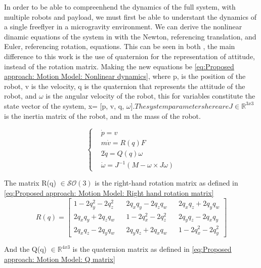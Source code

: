 In order to be able to compreenhend the dynamics of the full system, with multiple robots and payload, we must first be able to understant the dynamics of a single freeflyer in a microgravity environment. We can derive the nonlinear dinamic equations of the system in with the Newton, referencing translation, and Euler, referencing rotation, equations. This can be seen in both \cite{RoqueVentura2016spacecobot}, the main difference to this work is the use of quaternion for the representation of attitude, instead of the rotation matrix. Making the new equations be \ref{eq:Proposed approach: Motion Model: Nonlinear dynamics}, where p, is the position of the robot, v is the velocity, q is the quaternion that represents the attitude of the robot, and $\omega$ is the angular velocity of the robot, this for variables constitute the state vector of the system, x= [p, v, q, $\omega]. The system parameters here are J \in \mathbb{R}^{3x3}$ is the inertia matrix of the robot, and m the mass of the robot.

\begin{equation}
    \begin{cases}
        &\dot{p} = v \\
        &m\dot{v} = R(q)F \\
        &2\dot{q} = Q(q) \omega \\ 
        &\dot{\omega} = J^{-1} \left(M -\omega \times J\omega \right) 
    \end{cases}
    \label{eq:Proposed approach: Motion Model: Nonlinear dynamics}
\end{equation}

The matrix R(q) $\in \mathcal{SO}(3)$ is the right-hand rotation matrix as defined in \ref{eq:Proposed approach: Motion Model: Right hand rotation matrix}
\begin{equation}
    R\left(q\right) = 
    \begin{bmatrix}
    1 - 2q_{y}^{2} - 2q_{z}^{2} && 2q_{x}q_{y} - 2q_{z}q_{w} && 2q_{x}q_{z}+2q_{y}q_{w} \\
        2q_{x}q_{y} + 2q_{z}q_{w} && 1-2q_{x}^{2}-2q_{z}^{2} && 2q_{y}q_{z}-2q_{x}q_{y} \\
        2q_{x}q_{z} - 2q_{y}q_{w} && 2q_{y}q_{z}+2q_{x}q_{w} && 1-2q_{x}^{2}-2q_{y}^{2}
    \end{bmatrix}
    \label{eq:Proposed approach: Motion Model: Right hand rotation matrix}
\end{equation}

And the Q(q) $\in \mathbb{R}^{4x3}$ is the quaternion matrix as defined in \ref{eq:Proposed approach: Motion Model: Q matrix}

